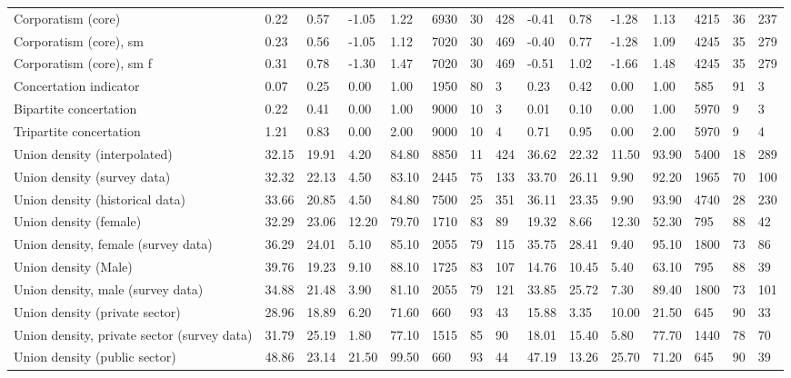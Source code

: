 \begin{longtable}{lllllllllllllll}
Corporatism (core) & 0.22 & 0.57 & -1.05 & 1.22 & 6930 & 30 & 428 & -0.41 & 0.78 & -1.28 & 1.13 & 4215 & 36 & 237\\
\addlinespace
Corporatism (core), sm & 0.23 & 0.56 & -1.05 & 1.12 & 7020 & 30 & 469 & -0.40 & 0.77 & -1.28 & 1.09 & 4245 & 35 & 279\\
Corporatism (core), sm f & 0.31 & 0.78 & -1.30 & 1.47 & 7020 & 30 & 469 & -0.51 & 1.02 & -1.66 & 1.48 & 4245 & 35 & 279\\
Concertation indicator & 0.07 & 0.25 & 0.00 & 1.00 & 1950 & 80 & 3 & 0.23 & 0.42 & 0.00 & 1.00 & 585 & 91 & 3\\
Bipartite concertation & 0.22 & 0.41 & 0.00 & 1.00 & 9000 & 10 & 3 & 0.01 & 0.10 & 0.00 & 1.00 & 5970 & 9 & 3\\
Tripartite concertation & 1.21 & 0.83 & 0.00 & 2.00 & 9000 & 10 & 4 & 0.71 & 0.95 & 0.00 & 2.00 & 5970 & 9 & 4\\
\addlinespace
Union density (interpolated) & 32.15 & 19.91 & 4.20 & 84.80 & 8850 & 11 & 424 & 36.62 & 22.32 & 11.50 & 93.90 & 5400 & 18 & 289\\
Union density (survey data) & 32.32 & 22.13 & 4.50 & 83.10 & 2445 & 75 & 133 & 33.70 & 26.11 & 9.90 & 92.20 & 1965 & 70 & 100\\
Union density (historical data) & 33.66 & 20.85 & 4.50 & 84.80 & 7500 & 25 & 351 & 36.11 & 23.35 & 9.90 & 93.90 & 4740 & 28 & 230\\
Union density (female) & 32.29 & 23.06 & 12.20 & 79.70 & 1710 & 83 & 89 & 19.32 & 8.66 & 12.30 & 52.30 & 795 & 88 & 42\\
Union density, female (survey data) & 36.29 & 24.01 & 5.10 & 85.10 & 2055 & 79 & 115 & 35.75 & 28.41 & 9.40 & 95.10 & 1800 & 73 & 86\\
\addlinespace
Union density (Male) & 39.76 & 19.23 & 9.10 & 88.10 & 1725 & 83 & 107 & 14.76 & 10.45 & 5.40 & 63.10 & 795 & 88 & 39\\
Union density, male (survey data) & 34.88 & 21.48 & 3.90 & 81.10 & 2055 & 79 & 121 & 33.85 & 25.72 & 7.30 & 89.40 & 1800 & 73 & 101\\
Union density (private sector) & 28.96 & 18.89 & 6.20 & 71.60 & 660 & 93 & 43 & 15.88 & 3.35 & 10.00 & 21.50 & 645 & 90 & 33\\
Union density, private sector (survey data) & 31.79 & 25.19 & 1.80 & 77.10 & 1515 & 85 & 90 & 18.01 & 15.40 & 5.80 & 77.70 & 1440 & 78 & 70\\
Union density (public sector) & 48.86 & 23.14 & 21.50 & 99.50 & 660 & 93 & 44 & 47.19 & 13.26 & 25.70 & 71.20 & 645 & 90 & 39\\

\end{longtable}
